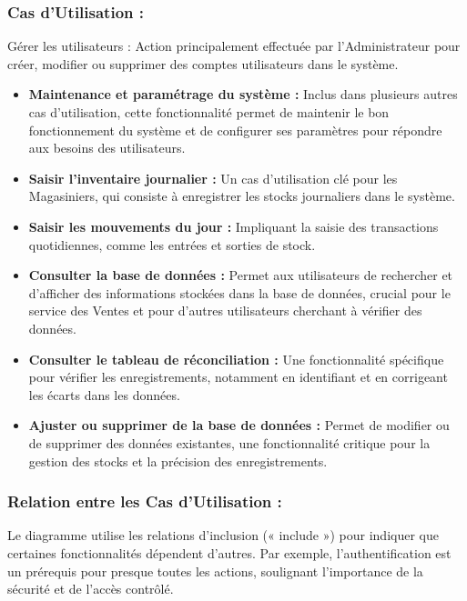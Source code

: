 \documentclass[a4paper, oneside, 12pt, final]{extreport}
\begin{document}
\subsubsection{Cas d'Utilisation :}
Gérer les utilisateurs : Action principalement effectuée par l'Administrateur pour créer, modifier ou supprimer des comptes utilisateurs dans le système.
\begin{itemize}
\item \textbf{Maintenance et paramétrage du système :} Inclus dans plusieurs autres cas d'utilisation, cette fonctionnalité permet de maintenir le bon fonctionnement du système et de configurer ses paramètres pour répondre aux besoins des utilisateurs.
\item \textbf{Saisir l'inventaire journalier :} Un cas d'utilisation clé pour les Magasiniers, qui consiste à enregistrer les stocks journaliers dans le système.
\item \textbf{Saisir les mouvements du jour :} Impliquant la saisie des transactions quotidiennes, comme les entrées et sorties de stock.
\item \textbf{Consulter la base de données : }Permet aux utilisateurs de rechercher et d'afficher des informations stockées dans la base de données, crucial pour le service des Ventes et pour d'autres utilisateurs cherchant à vérifier des données.
\item \textbf{Consulter le tableau de réconciliation :} Une fonctionnalité spécifique pour vérifier les enregistrements, notamment en identifiant et en corrigeant les écarts dans les données.
\item \textbf{Ajuster ou supprimer de la base de données :} Permet de modifier ou de supprimer des données existantes, une fonctionnalité critique pour la gestion des stocks et la précision des enregistrements.
\end{itemize}
\subsubsection{Relation entre les Cas d'Utilisation :}
Le diagramme utilise les relations d'inclusion (« include ») pour indiquer que certaines fonctionnalités dépendent d'autres. Par exemple, l'authentification est un prérequis pour presque toutes les actions, soulignant l'importance de la sécurité et de l'accès contrôlé.
\end{document}
